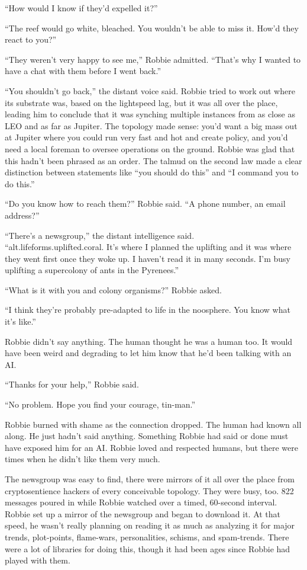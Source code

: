 “How would I know if they’d expelled it?”

“The reef would go white, bleached. You wouldn’t be able to miss
it. How’d they react to you?”

“They weren’t very happy to see me,” Robbie admitted. “That’s why I
wanted to have a chat with them before I went back.”

“You shouldn’t go back,” the distant voice said. Robbie tried to
work out where its substrate was, based on the lightspeed lag, but
it was all over the place, leading him to conclude that it was
synching multiple instances from as close as LEO and as far as
Jupiter. The topology made sense: you’d want a big mass out at
Jupiter where you could run very fast and hot and create policy,
and you’d need a local foreman to oversee operations on the ground.
Robbie was glad that this hadn’t been phrased as an order. The
talmud on the second law made a clear distinction between
statements like “you should do this” and “I command you to do
this.”

“Do you know how to reach them?” Robbie said. “A phone number, an
email address?”

“There’s a newsgroup,” the distant intelligence said.\\
“alt.lifeforms.uplifted.coral. It’s where I planned the uplifting
and it was where they went first once they woke up. I haven’t read
it in many seconds. I’m busy uplifting a supercolony of ants in the
Pyrenees.”

“What is it with you and colony organisms?” Robbie asked.

“I think they’re probably pre-adapted to life in the noosphere. You
know what it’s like.”

Robbie didn’t say anything. The human thought he was a human too.
It would have been weird and degrading to let him know that he’d
been talking with an AI.

“Thanks for your help,” Robbie said.

“No problem. Hope you find your courage, tin-man.”

Robbie burned with shame as the connection dropped. The human had
known all along. He just hadn’t said anything. Something Robbie had
said or done must have exposed him for an AI. Robbie loved and
respected humans, but there were times when he didn’t like them
very much.

The newsgroup was easy to find, there were mirrors of it all over
the place from cryptosentience hackers of every conceivable
topology. They were busy, too. 822 messages poured in while Robbie
watched over a timed, 60-second interval. Robbie set up a mirror of
the newsgroup and began to download it. At that speed, he wasn’t
really planning on reading it as much as analyzing it for major
trends, plot-points, flame-wars, personalities, schisms, and
spam-trends. There were a lot of libraries for doing this, though
it had been ages since Robbie had played with them.

